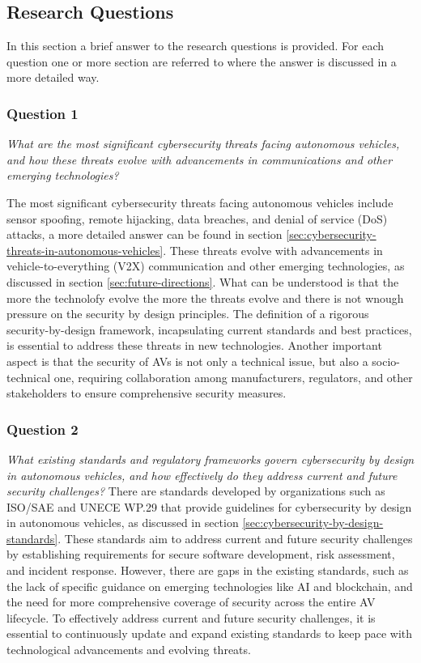 \subsection{Research Questions}\label{subsec:research-questions}
In this section a brief answer to the research questions is provided.
For each question one or more section are referred to where the answer is discussed in a more detailed way.

\subsubsection{Question 1}
\textit{What are the most significant cybersecurity threats facing autonomous vehicles, and how these threats evolve with advancements in communications and other emerging technologies?}

The most significant cybersecurity threats facing autonomous vehicles include sensor spoofing, remote hijacking, data breaches, and denial of service (DoS) attacks, a more detailed answer can be found in section \ref{sec:cybersecurity-threats-in-autonomous-vehicles}.
These threats evolve with advancements in vehicle-to-everything (V2X) communication and other emerging technologies, as discussed in section \ref{sec:future-directions}.
What can be understood is that the more the technolofy evolve the more the threats evolve and there is not wnough pressure on the security by design principles.
The definition of a rigorous security-by-design framework,  incapsulating current standards and best practices, is essential to address these threats in new technologies.
Another  important aspect is that the security of AVs is not only a technical issue, but also a socio-technical one, requiring collaboration among manufacturers, regulators, and other stakeholders to ensure comprehensive security measures.

\subsubsection{Question 2}
\textit{What existing standards and regulatory frameworks govern cybersecurity by design in autonomous vehicles, and how effectively do they address current and future security challenges?}
There are standards developed by organizations such as ISO/SAE and UNECE WP.29 that provide guidelines for cybersecurity by design in autonomous vehicles, as discussed in section \ref{sec:cybersecurity-by-design-standards}.
These standards aim to address current and future security challenges by establishing requirements for secure software development, risk assessment, and incident response.
However, there are gaps in the existing standards, such as the lack of specific guidance on emerging technologies like AI and blockchain, and the need for more comprehensive coverage of security across the entire AV lifecycle.
To effectively address current and future security challenges, it is essential to continuously update and expand existing standards to keep pace with technological advancements and evolving threats.

